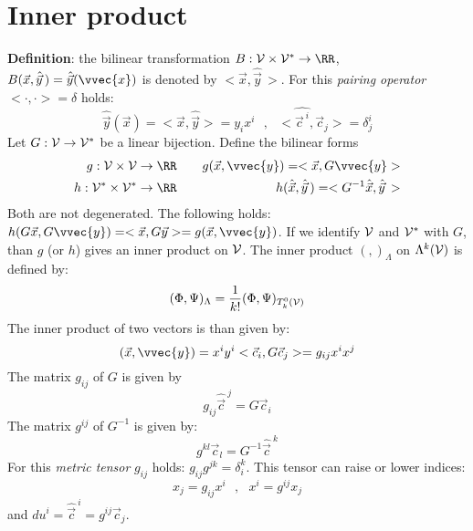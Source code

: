 \section{Inner product}
{\bf Definition}: the bilinear transformation $B:{\cal V}\times{\cal V}^*\rightarrow\RR$,
$B(\vec{x},\hat{\vec{y}}\,)=\hat{\vec{y}}(\vvec{x})$ is denoted by
$<\vec{x},\hat{\vec{y}}\,>$.
For this {\it pairing operator} $<\cdot,\cdot>=\delta$ holds:
\[
\hat{\vec{y}}(\vec{x})=<\vec{x},\hat{\vec{y}}>=y_ix^i~~~,~~~<\hat{\vec{c}^{~i}},\vec{c}_j>=\delta_j^i
\]
Let $G:{\cal V}\rightarrow{\cal V}^*$ be a linear bijection. Define the
bilinear forms
\begin{eqnarray*}
g:{\cal V\times V}\rightarrow\RR&~~~&g(\vec{x},\vvec{y})=<\vec{x},G\vvec{y}>\\
h:{\cal V^*\times V^*}\rightarrow\RR&~~~&h(\hat{\vec{x}},\hat{\vec{y}}\,)=<G^{-1}\hat{\vec{x}},\hat{\vec{y}}\,>
\end{eqnarray*}
Both are not degenerated. The following holds: $h(G\vec{x},G\vvec{y})=<\vec{x},G\vec{y}>=g(\vec{x},\vvec{y})$.
If we identify $\cal V$ and $\cal V^*$ with $G$, than $g$ (or $h$)
gives an inner product on $\cal V$.
\npar
The inner product $(,)_\Lambda$ on $\Lambda^k(\cal V)$ is defined by:
\[
(\Phi,\Psi)_\Lambda=\frac{1}{k!}(\Phi,\Psi)_{T^0_k(\cal V)}
\]
The inner product of two vectors is than given by:
\[
(\vec{x},\vvec{y})=x^iy^i<\vec{c}_i,G\vec{c}_j>=g_{ij}x^ix^j
\]
The matrix $g_{ij}$ of $G$ is given by
\[
g_{ij}\hat{\vec{c}}^{~j}=G\vec{c}_i
\]
The matrix $g^{ij}$ of $G^{-1}$ is given by:
\[
g^{kl}\vec{c}_l=G^{-1}\hat{\vec{c}}^{~k}
\]
For this {\it metric tensor} $g_{ij}$ holds: $g_{ij}g^{jk}=\delta_i^k$.
This tensor can raise or lower indices:
\[
x_j=g_{ij}x^i~~~,~~~x^i=g^{ij}x_j
\]
and $du^i=\hat{\vec{c}}^{~i}=g^{ij}\vec{c}_j$.
\npar

